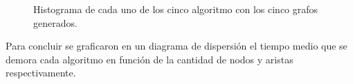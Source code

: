 \documentclass{article}
\begin{document}
\begin{figure}[htbp]
\caption{Histograma de cada uno de los cinco algoritmo con los cinco grafos generados.}
\label{fig:Fig01} 
\end{figure}
\newpage
Para concluir se graficaron en un diagrama de dispersión el tiempo medio que se demora cada algoritmo en función de la cantidad de nodos y aristas respectivamente.
\end{document}
